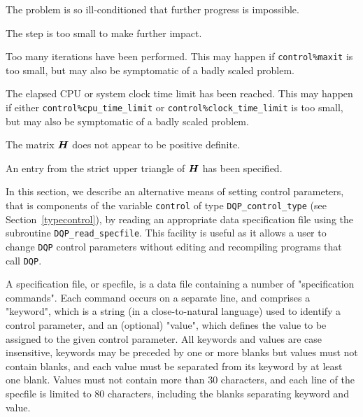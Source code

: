 \documentclass{galahad}
\newcommand{\packagename}{DQP}
\begin{document}
\begin{description}
 The problem is so ill-conditioned that
 further progress is impossible.

 The step is too small to make further impact.

 Too many iterations have been performed.
   This may happen if
    {\tt control\%maxit} is too small, but may also be symptomatic of
    a badly scaled problem.

 The elapsed CPU or system clock time limit has been
    reached. This may happen if either {\tt control\%cpu\_time\_limit} or
    {\tt control\%clock\_time\_limit} is too small, but may also be symptomatic
    of a badly scaled problem.

 The matrix ${\bm{H}}$ does not appear to be positive definite.

 An entry from the strict upper triangle of ${\bm{H}}$
 has been specified.

\end{description}


\galfeatures
\noindent In this section, we describe an alternative means of setting
control parameters, that is components of the variable {\tt control} of type
{\tt \packagename\_control\_type}
(see Section~\ref{typecontrol}),
by reading an appropriate data specification file using the
subroutine {\tt \packagename\_read\_specfile}. This facility
is useful as it allows a user to change  {\tt \packagename} control parameters
without editing and recompiling programs that call {\tt \packagename}.

A specification file, or specfile, is a data file containing a number of
"specification commands". Each command occurs on a separate line,
and comprises a "keyword",
which is a string (in a close-to-natural language) used to identify a
control parameter, and
an (optional) "value", which defines the value to be assigned to the given
control parameter. All keywords and values are case insensitive,
keywords may be preceded by one or more blanks but
values must not contain blanks, and
each value must be separated from its keyword by at least one blank.
Values must not contain more than 30 characters, and
each line of the specfile is limited to 80 characters,
including the blanks separating keyword and value.
\end{document}
